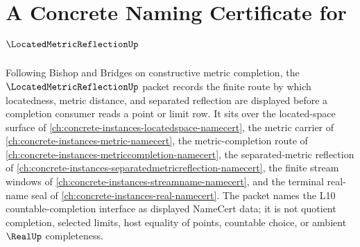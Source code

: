 \chapter{A Concrete Naming Certificate for $\LocatedMetricReflectionUp$}
\label{ch:concrete-instances-located-metric-reflection-namecert}

Following Bishop and Bridges on constructive metric completion, the $\LocatedMetricReflectionUp$ packet records the finite route by which locatedness, metric distance, and separated reflection are displayed before a completion consumer reads a point or limit row. It sits over the located-space surface of \autoref{ch:concrete-instances-locatedspace-namecert}, the metric carrier of \autoref{ch:concrete-instances-metric-namecert}, the metric-completion route of \autoref{ch:concrete-instances-metriccompletion-namecert}, the separated-metric reflection of \autoref{ch:concrete-instances-separatedmetricreflection-namecert}, the finite stream windows of \autoref{ch:concrete-instances-streamname-namecert}, and the terminal real-name seal of \autoref{ch:concrete-instances-real-namecert}. The packet names the L10 countable-completion interface as displayed NameCert data; it is not quotient completion, selected limits, host equality of points, countable choice, or ambient $\RealUp$ completeness.

